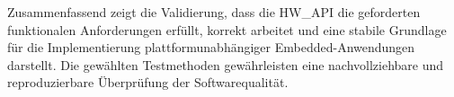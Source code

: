 Zusammenfassend zeigt die Validierung, dass die HW\_API die geforderten funktionalen Anforderungen erfüllt, korrekt arbeitet und eine stabile Grundlage für die Implementierung plattformunabhängiger Embedded-Anwendungen darstellt. 
Die gewählten Testmethoden gewährleisten eine nachvollziehbare und reproduzierbare Überprüfung der Softwarequalität.











































